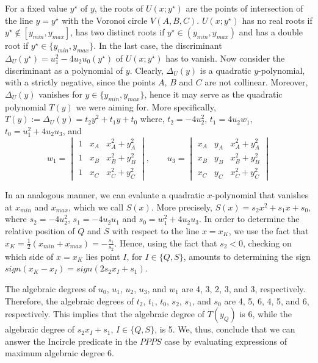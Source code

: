 \documentclass[letterpaper,11pt]{article}
\newcommand{\incircle}{\textsf{Incircle}\xspace}
\newcommand{\vor}{Voronoi\xspace}
\newcommand{\ppps}{$PPPS$\xspace}
\begin{document}
For a fixed value $y^\star$ of $y$, the roots of $U(x;y^\star)$
are the points of intersection of the line $y=y^\star$ with the \vor
circle $V(A,B,C)$. $U(x;y^\star)$ has no real roots if
$y^\star\not\in[y_{min},y_{max}]$, has two distinct roots if
$y^\star\in(y_{min},y_{max})$ and has a double root if
$y^\star\in\{y_{min},y_{max}\}$. In the last case, the discriminant
$\Delta_U(y^\star)=u_1^2-4u_2u_0(y^\star)$ of $U(x;y^\star)$ has to
vanish. Now consider the discriminant as a polynomial of $y$. Clearly,
$\Delta_U(y)$ is a quadratic $y$-polynomial, with a strictly
negative, since the points $A$, $B$ and $C$ are not
collinear. Moreover, $\Delta_U(y)$ vanishes for
$y\in\{y_{min},y_{max}\}$, hence it may serve as the quadratic
polynomial $T(y)$ we were aiming for.
More specifically, $T(y):=\Delta_U(y)=t_2y^2+t_1y+t_0$ where, 
$t_2 = -4 u_2^2$, $t_1 = 4 u_2 w_1$, $t_0 = u_1^2+4 u_2 u_3$, and
\begin{equation*}
w_1 = \begin{vmatrix}
1 & x_A & x_A^2 +y_A^2\\
1 & x_B & x_B^2 +y_B^2\\
1 & x_C & x_C^2 +y_C^2
\end{vmatrix}, \qquad
u_3 = \begin{vmatrix}
x_A & y_A & x_A^2 + y_A^2 \\
x_B & y_B & x_B^2 + y_B^2 \\
x_C & y_C & x_C^2 + y_C^2 
\end{vmatrix}
\end{equation*}

In an analogous manner, we can evaluate a quadratic $x$-polynomial
that vanishes at $x_{min}$ and $x_{max}$, which we call $S(x)$. More
precisely, $S(x) = s_2x^2+s_1x+s_0$, where
$s_2 = -4 u_2^2$, $s_1 = -4 u_2 u_1$ and $s_0 = w_1^2+4 u_2 u_3$.
In order to determine the relative position of  $Q$ and $S$ with
respect to the line $x=x_K$, we use the fact that
$x_K=\frac{1}{2}(x_{min}+x_{max})=-\frac{s_1}{s_2}$. Hence, using the
fact that $s_2<0$, checking on which side of $x=x_K$ lies point $I$,
for $I\in\{Q,S\}$, amounts to determining the sign
$sign(x_K-x_I)=sign(2s_2x_I+s_1)$.

The algebraic degrees of $u_0$, $u_1$, $u_2$, $u_3$, and $w_1$ are 4,
3, 2, 3, and 3, respectively. Therefore, the algebraic degrees of
$t_2$, $t_1$, $t_0$, $s_2$, $s_1$, and $s_0$ are 4, 5, 6, 4, 5, and 6,
respectively. This implies that the algebraic degree of $T(y_Q)$ is 6,
while the algebraic degree of $s_2x_I+s_1$, $I\in\{Q,S\}$, is 5. We,
thus, conclude that we can answer the \incircle predicate in the \ppps
case by evaluating expressions of maximum algebraic degree 6.
\end{document}
